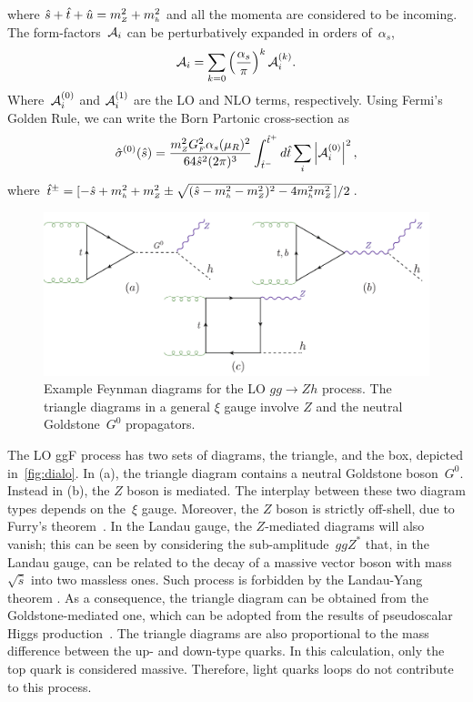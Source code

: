 where $\hat{s}+\hat{t}+\hat{u}=m_{ \scriptscriptstyle Z}^2+m_{ \scriptscriptstyle h}^2$ and all the momenta are considered to
be incoming. 
The form-factors~${\cal A}_i$ can be perturbatively expanded in orders of~$\alpha_s$, 
\begin{equation}
	{\cal A}_{i} = \sum_{k=0} \left(\frac{\alpha_s}{\pi} \right) ^k {\cal A}_i^{(k)}.
	\label{eq:ampexp}
\end{equation}
Where~${\cal A}_i^{(0)}$ and ${\cal A}_i^{(1)}$ are the LO and NLO terms, respectively. Using Fermi's Golden Rule, we can write the Born Partonic cross-section as
\begin{equation}
	\hat{\sigma}^{(0)}(\hat{s})=
	\frac{m_{ \scriptscriptstyle Z}^2 G_{ \scriptscriptstyle F}^2 \alpha_s(\mu_R)^2}{64 \hat{s}^2(2\pi)^3}
	\int^{\hat{t}^+}_{\hat{t}^-}d\hat{t}\sum_i \left|{\cal A}_i^{(0)}\right|^2,
\end{equation}
where
$\hat{t}^\pm=[-\hat{s}+m_{ \scriptscriptstyle h}^2+m_{ \scriptscriptstyle Z}^2\pm\sqrt{(\hat{s}-m_{ \scriptscriptstyle h}^2-m_{ \scriptscriptstyle Z}^2)^2-4m_{ \scriptscriptstyle h}^2m_{ \scriptscriptstyle Z}^2}\,]/2$.
\begin{figure}
	\begin{center}
		\includegraphics[width=12cm]{./figures/Feynman_LO}
		\caption{Example Feynman diagrams for the LO $gg \to Zh$ process. The triangle diagrams in a general $\xi$ gauge involve $Z$ and the neutral Goldstone~$G^0$ propagators. }
		\label{fig:dialo}
	\end{center}
\end{figure}
\par The LO ggF process has two sets of diagrams, the triangle, and the box, depicted in~\autoref{fig:dialo}. In (a), the triangle diagram contains a neutral Goldstone boson~$G^0$. Instead in (b), the $Z$ boson is mediated. The interplay between these two diagram types depends on the~$\xi$ gauge. Moreover, the $Z$ boson is strictly off-shell, due to Furry's theorem~\cite{PhysRev.51.125}.
In the Landau gauge, the $Z$-mediated diagrams will also vanish; this can be seen by considering the sub-amplitude~$ggZ^*$ that, in the Landau gauge, can be related to the decay of a massive vector boson
with mass $\sqrt{\hat{s}}$ into two massless ones. Such process is
forbidden by the Landau-Yang theorem \cite{Landau:1948kw, Yang:1950rg}. As a consequence, the triangle diagram can be obtained from the Goldstone-mediated one, which can be adopted from the results of pseudoscalar Higgs production~\cite{Spira:1995rr,Aglietti:2006tp}. 
The triangle diagrams are also proportional to the mass difference between the up- and down-type quarks. In this calculation, only the top quark is considered massive. Therefore, light quarks loops do not contribute to this process.

